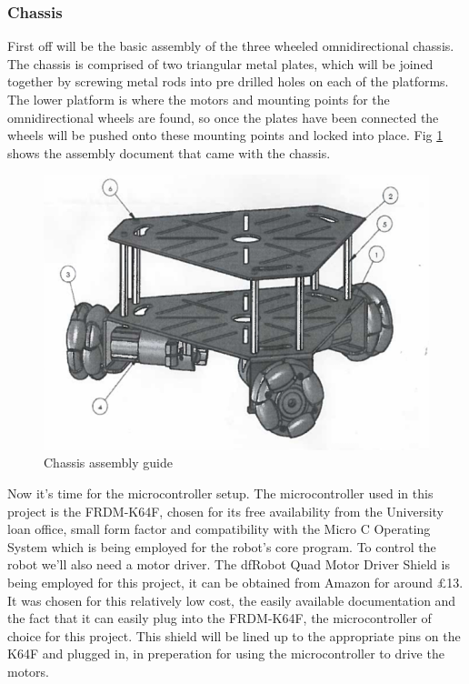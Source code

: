 				\subsubsection{Chassis}
				First off will be the basic assembly of the three wheeled omnidirectional chassis. The chassis is comprised of two triangular metal plates, which will be joined together by screwing metal rods into pre drilled holes on each of the platforms. The lower platform is where the motors and mounting points for the omnidirectional wheels are found, so once the plates have been connected the wheels will be pushed onto these mounting points and locked into place. Fig \ref{fig:chassisassembly} shows the assembly document that came with the chassis.
				\begin{figure}[h]
					\centering
					\includegraphics[width=.9\linewidth]{SYNTHESIS/chassisassembly.png}
					\caption{Chassis assembly guide}
					\label{fig:chassisassembly}
				\end{figure}
				
				Now it's time for the microcontroller setup. The microcontroller used in this project is the FRDM-K64F, chosen for its free availability from the University loan office, small form factor and compatibility with the Micro C Operating System which is being employed for the robot's core program. To control the robot we'll also need a motor driver. The dfRobot Quad Motor Driver Shield is being employed for this project, it can be obtained from Amazon for around \pounds{13}. It was chosen for this relatively low cost, the easily available documentation and the fact that it can easily plug into the FRDM-K64F, the microcontroller of choice for this project. This shield will be lined up to the appropriate pins on the K64F and plugged in, in preperation for using the microcontroller to drive the motors. 
				

